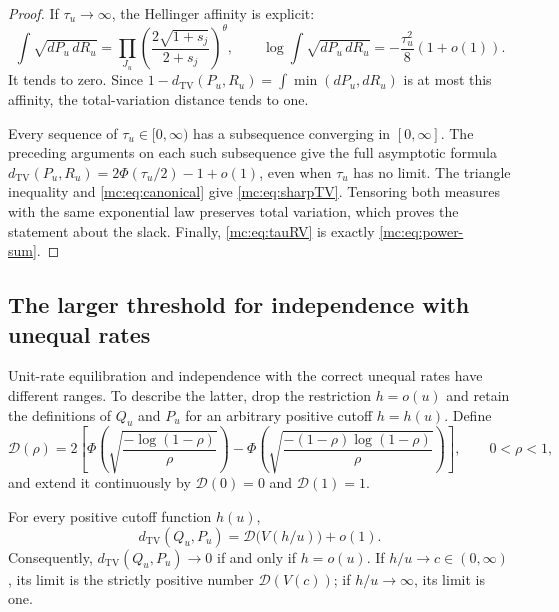 \begin{proof}
If $\tau_u\to\infty$, the Hellinger affinity is explicit:
\begin{equation}\label{mc:eq:affinity}
 \int\sqrt{dP_u\,dR_u}
 =\prod_{J_u}\left(\frac{2\sqrt{1+s_j}}{2+s_j}\right)^\theta,
 \qquad
 \log\int\sqrt{dP_u\,dR_u}
 =-\frac{\tau_u^2}{8}(1+o(1)).
\end{equation}
It tends to zero.  Since
$1-d_{\mathrm{TV}}(P_u,R_u)=\int\min(dP_u,dR_u)$ is at most this
affinity, the total-variation distance tends to one.

Every sequence of $\tau_u\in[0,\infty)$ has a subsequence converging
in $[0,\infty]$.  The preceding arguments on each such subsequence
give the full asymptotic formula
$d_{\mathrm{TV}}(P_u,R_u)=2\Phi(\tau_u/2)-1+o(1)$, even when
$\tau_u$ has no limit.  The triangle inequality and
\eqref{mc:eq:canonical} give \eqref{mc:eq:sharpTV}.  Tensoring both
measures with the same exponential law preserves total variation,
which proves the statement about the slack.  Finally,
\eqref{mc:eq:tauRV} is exactly \eqref{mc:eq:power-sum}.
\end{proof}

\subsection{The larger threshold for independence with unequal rates}

Unit-rate equilibration and independence with the correct unequal rates
have different ranges.  To describe the latter, drop the restriction
$h=o(u)$ and retain the definitions of $Q_u$ and $P_u$ for an arbitrary
positive cutoff $h=h(u)$.  Define
\begin{equation}\label{mc:eq:Dprofile}
 \mathcal D(\rho)=2\left[
 \Phi\left(\sqrt{\frac{-\log(1-\rho)}{\rho}}\right)
 -\Phi\left(\sqrt{
       \frac{-(1-\rho)\log(1-\rho)}{\rho}}\right)\right],
 \qquad 0<\rho<1,
\end{equation}
and extend it continuously by $\mathcal D(0)=0$ and
$\mathcal D(1)=1$.

\begin{theorem}
\label{mc:thm:macroscopic}
For every positive cutoff function $h(u)$,
\begin{equation}\label{mc:eq:macroTV}
 d_{\mathrm{TV}}(Q_u,P_u)
 =\mathcal D\bigl(V(h/u)\bigr)+o(1).
\end{equation}
Consequently, $d_{\mathrm{TV}}(Q_u,P_u)\to0$ if and only if $h=o(u)$.
If $h/u\to c\in(0,\infty)$, its limit is the strictly positive number
$\mathcal D(V(c))$; if $h/u\to\infty$, its limit is one.
\end{theorem}

